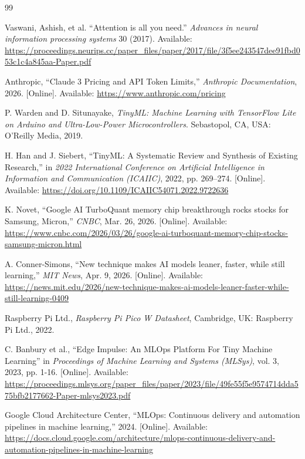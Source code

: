 \documentclass[11pt,a4paper,openany]{book}
\begin{document}
\renewcommand{\bibname}{References}
\begin{thebibliography}{99}

 Vaswani, Ashish, et al. ``Attention is all you need.'' \textit{Advances in neural information processing systems} 30 (2017). Available: \url{https://proceedings.neurips.cc/paper_files/paper/2017/file/3f5ee243547dee91fbd053c1c4a845aa-Paper.pdf}

 Anthropic, ``Claude 3 Pricing and API Token Limits,'' \textit{Anthropic Documentation}, 2026. [Online]. Available: \url{https://www.anthropic.com/pricing}

 P. Warden and D. Situnayake, \textit{TinyML: Machine Learning with TensorFlow Lite on Arduino and Ultra-Low-Power Microcontrollers}. Sebastopol, CA, USA: O'Reilly Media, 2019.

 H. Han and J. Siebert, ``TinyML: A Systematic Review and Synthesis of Existing Research,'' in \textit{2022 International Conference on Artificial Intelligence in Information and Communication (ICAIIC)}, 2022, pp. 269--274. [Online]. Available: \url{https://doi.org/10.1109/ICAIIC54071.2022.9722636}

 K. Novet, ``Google AI TurboQuant memory chip breakthrough rocks stocks for Samsung, Micron,'' \textit{CNBC}, Mar. 26, 2026. [Online]. Available: \url{https://www.cnbc.com/2026/03/26/google-ai-turboquant-memory-chip-stocks-samsung-micron.html}

 A. Conner-Simons, ``New technique makes AI models leaner, faster, while still learning,'' \textit{MIT News}, Apr. 9, 2026. [Online]. Available: \url{https://news.mit.edu/2026/new-technique-makes-ai-models-leaner-faster-while-still-learning-0409}

 Raspberry Pi Ltd., \textit{Raspberry Pi Pico W Datasheet}, Cambridge, UK: Raspberry Pi Ltd., 2022.

 C. Banbury et al., ``Edge Impulse: An MLOps Platform For Tiny Machine Learning'' in \textit{Proceedings of Machine Learning and Systems (MLSys)}, vol. 3, 2023, pp. 1-16. [Online]. Available: \url{https://proceedings.mlsys.org/paper_files/paper/2023/file/49fe55f5e9574714dda575bfb2177662-Paper-mlsys2023.pdf}

 Google Cloud Architecture Center, ``MLOps: Continuous delivery and automation pipelines in machine learning,'' 2024. [Online]. Available: \url{https://docs.cloud.google.com/architecture/mlops-continuous-delivery-and-automation-pipelines-in-machine-learning}


\end{thebibliography}
\end{document}
